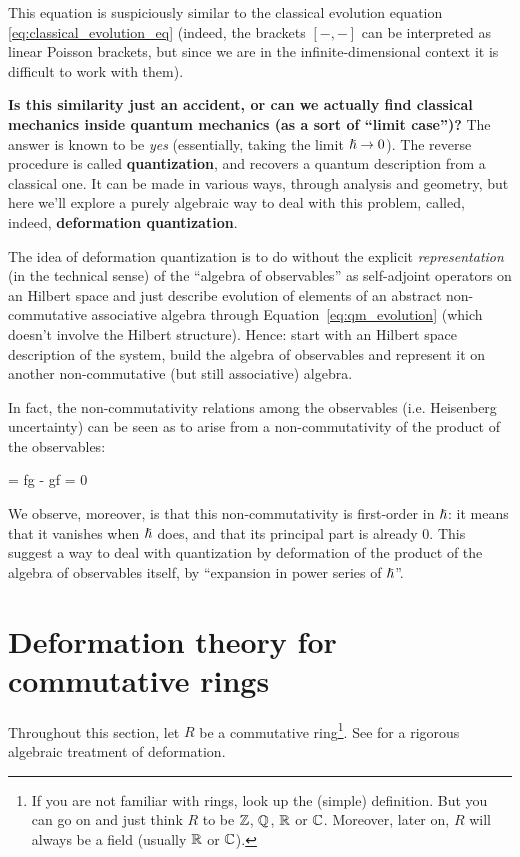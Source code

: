 \documentclass[main.tex]{subfiles}
\begin{document}
This equation is suspiciously similar to the classical evolution equation \eqref{eq:classical_evolution_eq} (indeed, the brackets $[-,-]$ can be interpreted as linear Poisson brackets, but since we are in the infinite-dimensional context it is difficult to work with them).

\textbf{Is this similarity just an accident, or can we actually find classical mechanics inside quantum mechanics (as a sort of ``limit case'')?} The answer is known to be \emph{yes} (essentially, taking the limit ${\boldsymbol\hslash} \to 0$). The reverse procedure is called \textbf{quantization}, and recovers a quantum description from a classical one. It can be made in various ways, through analysis and geometry, but here we'll explore a purely algebraic way to deal with this problem, called, indeed, \textbf{deformation quantization}.

The idea of deformation quantization is to do without the explicit \emph{representation} (in the technical sense) of the ``algebra of observables'' as self-adjoint operators on an Hilbert space and just describe evolution of elements of an abstract non-commutative associative algebra through Equation~\eqref{eq:qm_evolution} (which doesn't involve the Hilbert structure). Hence: start with an Hilbert space description of the system, build the algebra of observables and represent it on another non-commutative (but still associative) algebra.

In fact, the non-commutativity relations among the observables (i.e. Heisenberg uncertainty) can be seen as to arise from a non-commutativity of the product of the observables:
\begin{eqalign}
	[f,g] = fg - gf = 0 \iff {}
\end{eqalign}
We observe, moreover, is that this non-commutativity is first-order in ${\boldsymbol\hslash}$: it means that it vanishes when ${\boldsymbol\hslash}$ does, and that its principal part is already $0$. This suggest a way to deal with quantization by deformation of the product of the algebra of observables itself, by ``expansion in power series of ${\boldsymbol\hslash}$''.

\section{Deformation theory for commutative rings}
Throughout this section, let $R$ be a commutative ring\footnote{If you are not familiar with rings, look up the (simple) definition. But you can go on and just think $R$ to be $\mathbb{Z}$, $\mathbb{Q}$, $\mathbb{R}$ or $\mathbb{C}$. Moreover, later on, $R$ will always be a field (usually $\mathbb{R}$ or $\mathbb{C}$).}. See \cite{gerstenhaber1964deformation} for a rigorous algebraic treatment of deformation.
\end{document}
